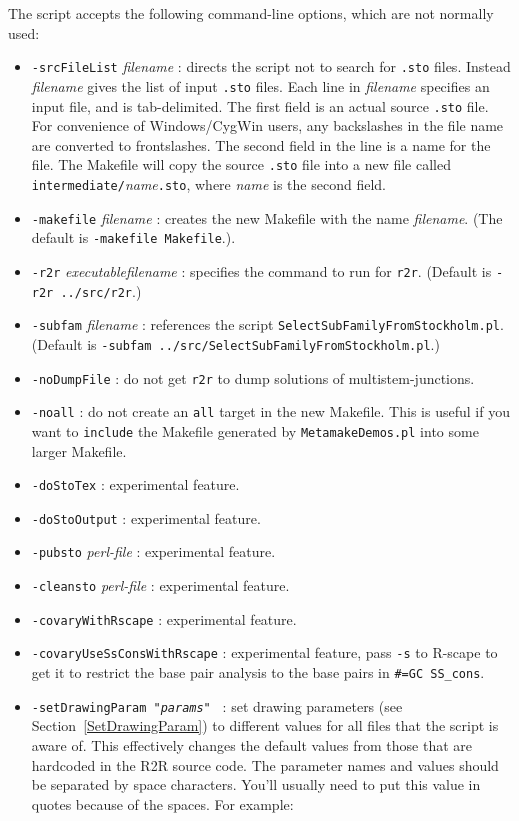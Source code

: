 \documentclass[letterpaper,12pt]{report}
\begin{document}
The script accepts the following command-line options, which are not normally used:
\begin{itemize}
\item {\tt -srcFileList} {\it filename} : directs the script not to search for {\tt .sto} files.  Instead {\it filename}
gives the list of input {\tt .sto} files.  Each line in {\it filename} specifies an input file, and is tab-delimited.
The first field is an actual source {\tt .sto} file.  For convenience of Windows/CygWin users, any backslashes in the file name
are converted to frontslashes.
The second field in the line is a name for the file.  The Makefile will copy the source {\tt .sto} file into a new
file called {\tt intermediate/}{\it name}{\tt .sto}, where {\it name} is the second field.
\item {\tt -makefile} {\it filename} : creates the new Makefile with the name {\it filename}.
(The default is {\tt -makefile Makefile}.).
\item {\tt -r2r} {\it executablefilename} : specifies the command to run for {\tt r2r}. (Default is {\tt -r2r ../src/r2r}.)
\item {\tt -subfam} {\it filename} : references the script {\tt SelectSubFamilyFromStockholm.pl}.  (Default is {\tt -subfam ../src/SelectSubFamilyFromStockholm.pl}.)
\item {\tt -noDumpFile} : do not get {\tt r2r} to dump solutions of multistem-junctions.
\item {\tt -noall} : do not create an {\tt all} target in the new Makefile.  This is useful if you want to {\tt include}
the Makefile generated by {\tt MetamakeDemos.pl} into some larger Makefile.
\item {\tt -doStoTex} : experimental feature.
\item {\tt -doStoOutput} : experimental feature.
\item {\tt -pubsto} {\it perl-file} : experimental feature.
\item {\tt -cleansto} {\it perl-file} : experimental feature.
\item {\tt -covaryWithRscape} : experimental feature.
\item {\tt -covaryUseSsConsWithRscape} : experimental feature, pass {\tt -s} to R-scape to get it to restrict the base pair analysis to the base pairs in {\tt \#=GC SS\_cons}.
\item {\tt -setDrawingParam "{\it params}" } : set drawing parameters (see Section~\ref{SetDrawingParam}) to different values for all files that the script is aware of.  This effectively changes the default values from those that are hardcoded in the R2R source code.  The parameter names and values should be separated by space characters.  You'll usually need to put this value in quotes because of the spaces.  For example:


\end{itemize}
\end{document}

